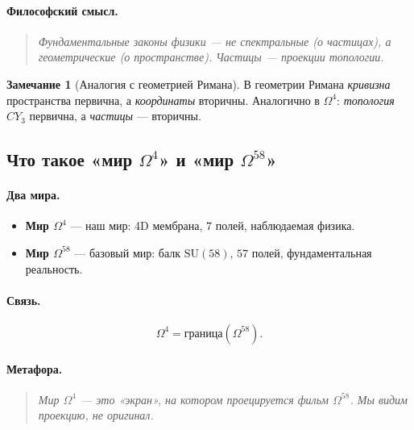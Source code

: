 \documentclass[11pt,a4paper]{article}
\newcommand{\SU}{\mathrm{SU}}
\newcommand{\CY}{CY_3}
\newcommand{\Om}{\Omega^4}
\newcommand{\Omfi}{\Omega^{58}}
\theoremstyle{definition}
\newtheorem{remark}[theorem]{Замечание}
\begin{document}
\paragraph{Философский смысл.}
\begin{quote}
\itshape
Фундаментальные законы физики — не \emph{спектральные} 
(о частицах), а \emph{геометрические} (о пространстве). 
Частицы — \emph{проекции} топологии.
\end{quote}

\begin{remark}[Аналогия с геометрией Римана]
\label{rem:riemann-analogy}
В геометрии Римана \emph{кривизна} пространства первична, 
а \emph{координаты} вторичны. Аналогично в $\Om$: 
\emph{топология} $\CY$ первична, а \emph{частицы} — вторичны.
\end{remark}

\subsection{Что такое «мир $\Om$» и «мир $\Omfi$»}
\label{subsec:worlds-philosophy}

\paragraph{Два мира.}

\begin{itemize}
    \item \textbf{Мир $\Om$} — наш мир: 4D мембрана, $7$ полей, 
          наблюдаемая физика.
    \item \textbf{Мир $\Omfi$} — базовый мир: балк $\SU(58)$, 
          $57$ полей, фундаментальная реальность.
\end{itemize}

\paragraph{Связь.}
\begin{equation}
    \Om = \text{граница}(\Omfi).
\end{equation}

\paragraph{Метафора.}
\begin{quote}
\itshape
Мир $\Om$ — это «экран», на котором проецируется фильм $\Omfi$. 
Мы видим \emph{проекцию}, не \emph{оригинал}.
\end{quote}
\end{document}
